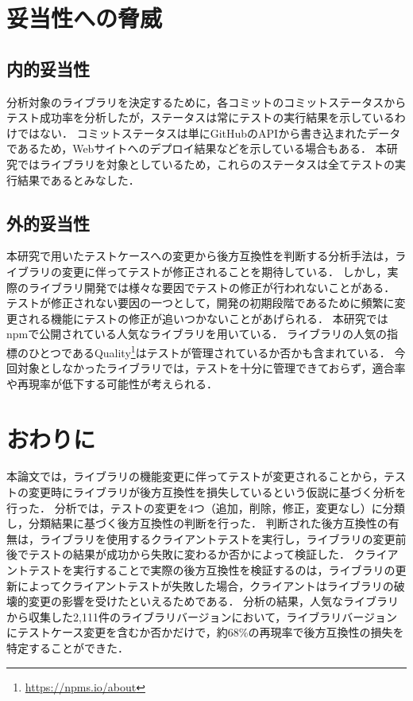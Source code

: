 \documentclass[submit]{ipsj}
\begin{document}
\section{妥当性への脅威}
\subsection{内的妥当性}
分析対象のライブラリを決定するために，各コミットのコミットステータスからテスト成功率を分析したが，ステータスは常にテストの実行結果を示しているわけではない．
コミットステータスは単にGitHubのAPIから書き込まれたデータであるため，Webサイトへのデプロイ結果などを示している場合もある．
本研究ではライブラリを対象としているため，これらのステータスは全てテストの実行結果であるとみなした．

\subsection{外的妥当性}
本研究で用いたテストケースへの変更から後方互換性を判断する分析手法は，ライブラリの変更に伴ってテストが修正されることを期待している．
しかし，実際のライブラリ開発では様々な要因でテストの修正が行われないことがある．
テストが修正されない要因の一つとして，開発の初期段階であるために頻繁に変更される機能にテストの修正が追いつかないことがあげられる．
本研究ではnpmで公開されている人気なライブラリを用いている．
ライブラリの人気の指標のひとつであるQuality\footnote{\url{https://npms.io/about}}はテストが管理されているか否かも含まれている．
今回対象としなかったライブラリでは，テストを十分に管理できておらず，適合率や再現率が低下する可能性が考えられる．

\section{おわりに}
\label{sec:conclusion}
本論文では，ライブラリの機能変更に伴ってテストが変更されることから，テストの変更時にライブラリが後方互換性を損失しているという仮説に基づく分析を行った．
分析では，テストの変更を4つ（追加，削除，修正，変更なし）に分類し，分類結果に基づく後方互換性の判断を行った．
判断された後方互換性の有無は，ライブラリを使用するクライアントテストを実行し，ライブラリの変更前後でテストの結果が成功から失敗に変わるか否かによって検証した．
クライアントテストを実行することで実際の後方互換性を検証するのは，ライブラリの更新によってクライアントテストが失敗した場合，クライアントはライブラリの破壊的変更の影響を受けたといえるためである．
分析の結果，人気なライブラリから収集した2,111件のライブラリバージョンにおいて，ライブラリバージョンにテストケース変更を含むか否かだけで，約68\%の再現率で後方互換性の損失を特定することができた．
\end{document}

